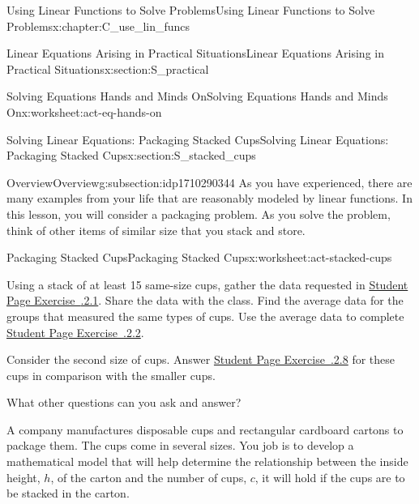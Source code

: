 \documentclass[oneside,10pt,]{book}
\newcommand{\xreffont}{\relax}
\numberwithin{equation}{chapter}
\begin{document}
\begin{chapterptx}{Using Linear Functions to Solve Problems}{}{Using Linear Functions to Solve Problems}{}{}{x:chapter:C_use_lin_funcs}
\begin{sectionptx}{Linear Equations Arising in Practical Situations}{}{Linear Equations Arising in Practical Situations}{}{}{x:section:S_practical}
\begin{worksheet-subsection}{Solving Equations \textemdash{} Hands and Minds On}{}{Solving Equations \textemdash{} Hands and Minds On}{}{}{x:worksheet:act-eq-hands-on}
\end{worksheet-subsection}
\restoregeometry
\end{sectionptx}
%
%
\typeout{************************************************}
\typeout{************************************************}
%
\begin{sectionptx}{Solving Linear Equations: Packaging Stacked Cups}{}{Solving Linear Equations: Packaging Stacked Cups}{}{}{x:section:S_stacked_cups}
%
%
\typeout{************************************************}
\typeout{************************************************}
%
\begin{subsectionptx}{Overview}{}{Overview}{}{}{g:subsection:idp1710290344}
As you have experienced, there are many examples from your life that are reasonably modeled by linear functions. In this lesson, you will consider a packaging problem. As you solve the problem, think of other items of similar size that you stack and store.%
\end{subsectionptx}
%
%
\typeout{************************************************}
\typeout{************************************************}
%
\begin{worksheet-subsection}{Packaging Stacked Cups}{}{Packaging Stacked Cups}{}{}{x:worksheet:act-stacked-cups}
\begin{introduction}{}%
Using a stack of at least 15 same-size cups, gather the data requested in \hyperlink{x:exercise:exer-cups-table}{Student Page Exercise~{\xreffont 3.2.2.1}}. Share the data with the class. Find the average data for the groups that measured the same types of cups. Use the average data to complete \hyperlink{x:exercise:exer-cups-graph}{Student Page Exercise~{\xreffont 3.2.2.2}\textendash{}{\xreffont 3.2.2.7}}.%
\par
Consider the second size of cups. Answer \hyperlink{x:exercise:exer-cups-large}{Student Page Exercise~{\xreffont 3.2.2.8}} for these cups in comparison with the smaller cups.%
\par
What other questions can you ask and answer?%
\par
A company manufactures disposable cups and rectangular cardboard cartons to package them. The cups come in several sizes. You job is to develop a mathematical model that will help determine the relationship between the inside height, \(h\), of the carton and the number of cups, \(c\), it will hold if the cups are to be stacked in the carton.%

\end{introduction}
\end{worksheet-subsection}
\end{sectionptx}
\end{chapterptx}
\end{document}
